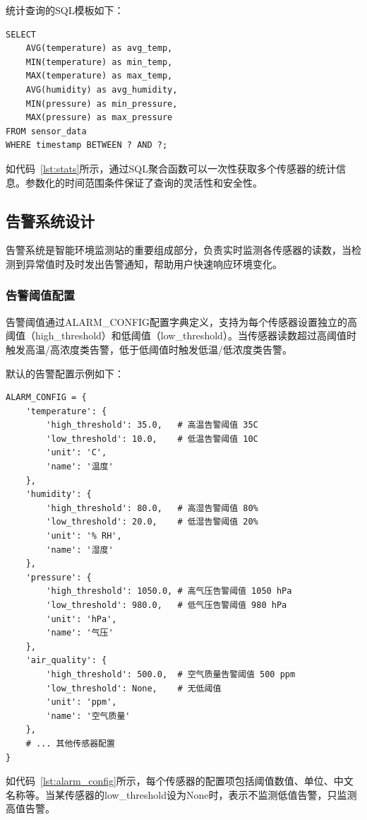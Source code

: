 \documentclass[12pt,a4paper]{ctexart}
\begin{document}
统计查询的SQL模板如下：
\begin{lstlisting}[caption={统计查询SQL模板},label={lst:stats}]
SELECT 
    AVG(temperature) as avg_temp,
    MIN(temperature) as min_temp,
    MAX(temperature) as max_temp,
    AVG(humidity) as avg_humidity,
    MIN(pressure) as min_pressure,
    MAX(pressure) as max_pressure
FROM sensor_data
WHERE timestamp BETWEEN ? AND ?;
\end{lstlisting}

如代码~\ref{lst:stats}所示，通过SQL聚合函数可以一次性获取多个传感器的统计信息。参数化的时间范围条件保证了查询的灵活性和安全性。

\subsection{告警系统设计}

告警系统是智能环境监测站的重要组成部分，负责实时监测各传感器的读数，当检测到异常值时及时发出告警通知，帮助用户快速响应环境变化。

\subsubsection{告警阈值配置}

告警阈值通过ALARM\_CONFIG配置字典定义，支持为每个传感器设置独立的高阈值（high\_threshold）和低阈值（low\_threshold）。当传感器读数超过高阈值时触发高温/高浓度类告警，低于低阈值时触发低温/低浓度类告警。

默认的告警配置示例如下：
\begin{lstlisting}[caption={告警阈值配置示例},label={lst:alarm_config}]
ALARM_CONFIG = {
    'temperature': {
        'high_threshold': 35.0,   # 高温告警阈值 35C
        'low_threshold': 10.0,    # 低温告警阈值 10C
        'unit': 'C',
        'name': '温度'
    },
    'humidity': {
        'high_threshold': 80.0,   # 高湿告警阈值 80%
        'low_threshold': 20.0,    # 低湿告警阈值 20%
        'unit': '% RH',
        'name': '湿度'
    },
    'pressure': {
        'high_threshold': 1050.0, # 高气压告警阈值 1050 hPa
        'low_threshold': 980.0,   # 低气压告警阈值 980 hPa
        'unit': 'hPa',
        'name': '气压'
    },
    'air_quality': {
        'high_threshold': 500.0,  # 空气质量告警阈值 500 ppm
        'low_threshold': None,    # 无低阈值
        'unit': 'ppm',
        'name': '空气质量'
    },
    # ... 其他传感器配置
}
\end{lstlisting}

如代码~\ref{lst:alarm_config}所示，每个传感器的配置项包括阈值数值、单位、中文名称等。当某传感器的low\_threshold设为None时，表示不监测低值告警，只监测高值告警。
\end{document}
